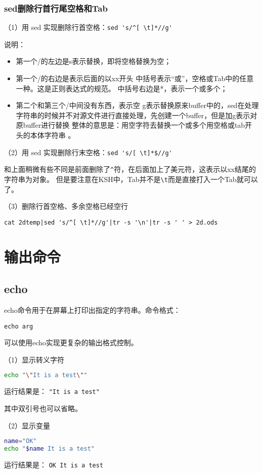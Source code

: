 \subsubsection{sed删除行首行尾空格和Tab}
（1）用 sed 实现删除行首空格：\verb|sed 's/^[ \t]*//g'|

说明： 
\begin{itemize}
\item 第一个/的左边是s表示替换，即将空格替换为空；
\item 第一个/的右边是表示后面的以xx开头 中括号表示“或”，空格或Tab中的任意一种。这是正则表达式的规范。 中括号右边是*，表示一个或多个；
\item 第二个和第三个/中间没有东西，表示空 g表示替换原来buffer中的，sed在处理字符串的时候并不对源文件进行直接处理，先创建一个buffer，但是加g表示对原buffer进行替换 整体的意思是：用空字符去替换一个或多个用空格或tab开头的本体字符串 。
\end{itemize}

（2）用 sed 实现删除行末空格：\verb|sed 's/[ \t]*$//g' |

和上面稍微有些不同是前面删除了\verb|^|符，在后面加上了美元符，这表示以xx结尾的字符串为对象。 
但是要注意在KSH中，Tab并不是\verb|\t|而是直接打入一个Tab就可以了。

（3）删除行首空格、多余空格已经空行
\begin{lstlisting}
cat 2dtemp|sed 's/^[ \t]*//g'|tr -s '\n'|tr -s ' ' > 2d.ods
\end{lstlisting}

\section{输出命令}
\subsection{echo}
echo命令用于在屏幕上打印出指定的字符串。命令格式：

\verb|echo arg|

可以使用echo实现更复杂的输出格式控制。

（1）显示转义字符
\begin{lstlisting}[language=sh]
echo "\"It is a test\""
\end{lstlisting}
运行结果是：
\verb|"It is a test"|

其中双引号也可以省略。

（2）显示变量
\begin{lstlisting}[language=sh]
name="OK"
echo "$name It is a test"
\end{lstlisting}
运行结果是：
\verb|OK It is a test|

